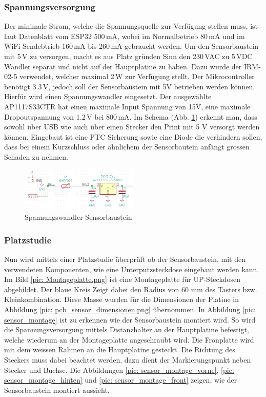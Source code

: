 \subsubsection{Spannungsversorgung}
Der minimale Strom, welche die Spannungsquelle zur Verfügung stellen muss, ist laut Datenblatt vom ESP32 500\,mA, wobei im Normalbetrieb 80\,mA und im WiFi Sendebtrieb 160\,mA bis 260\,mA gebraucht werden.
Um den Sensorbaustein mit 5\,V zu versorgen, macht es aus Platz gründen Sinn den 230\,VAC zu 5\,VDC Wandler separat und nicht auf der Hauptplatine zu haben. Dazu wurde der IRM-02-5 verwendet, welcher maximal 2\,W zur Verfügung stellt. Der Mikrocontroller benötigt 3.3\,V, jedoch soll der Sensorbaustein mit 5V betrieben werden können. Hierfür wird einen Spannungswandler eingesetzt. Der ausgewählte AP1117S33CTR hat einen maximale Input Spannung von 15V, eine maximale Dropoutspannung von 1.2\,V bei 800\,mA. Im Schema (Abb. \ref{pic: Wandler_Sensor}) erkennt man, dass sowohl über USB wie auch über einen Stecker den Print mit 5 V versorgt werden können. Eingebaut ist eine PTC Sicherung sowie eine Diode die verhindern sollen, dass bei einem Kurzschluss oder ähnlichem der Sensorbautein anfängt grossen Schaden zu nehmen.

\begin{figure}[h!]
	\centering
	\includegraphics[width=0.5\textwidth]{graphics/shematics_sensor_33V.png}
	\caption{Spannungswandler Sensorbaustein}
	\label{pic: Wandler_Sensor}
\end{figure}

\subsubsection{Platzstudie}
Nun wird mittels einer Platzstudie überprüft ob der Sensorbaustein, mit den verwendeten Komponenten, wie eine Unterputzsteckdose eingebaut werden kann.
Im Bild \ref{pic: Montageplatte.png} ist eine Montageplatte für UP-Steckdosen abgebildet. Der blaue Kreis Zeigt dabei den Radius von 60 mm des Tasters bzw. Kleinkombination. Diese Masse wurden für die Dimensionen der Platine in Abbildung \ref{pic: pcb_sensor_dimensionen.png} übernommen. In Abbildung \ref{pic: sensor_montage} ist zu erkennen wie der Sensorbaustein montiert wird. So wird die Spannungsversorgung mittels Distanzhalter an der Hauptplatine befestigt, welche wiederum an der Montageplatte angeschraubt wird. Die Fronplatte wird mit dem weissen Rahmen an die Hauptplatine gesteckt. Die Richtung des Steckers muss dabei beachtet werden, dazu dient der Markierungspunkt neben Stecker und Buchse. Die Abbildungen  \ref{pic: sensor_montage_vorne}, \ref{pic: sensor_montage_hinten} und \ref{pic: sensor_montage_front} zeigen, wie der Sensorbaustein montiert aussieht.

